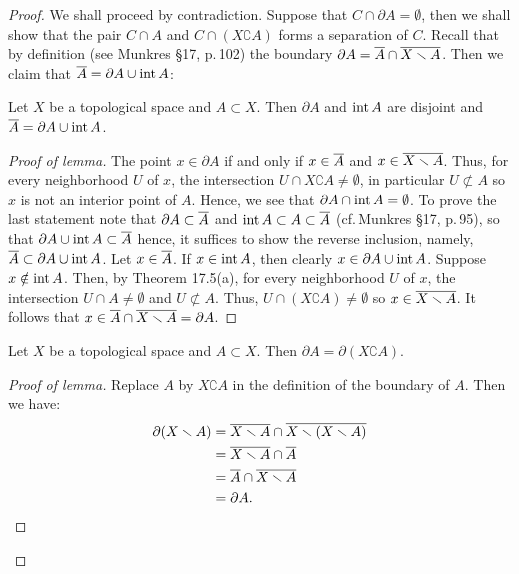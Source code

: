 \begin{proof}
We shall proceed by contradiction. Suppose that $C\cap\partial
A=\emptyset$, then we shall show that the pair $C\cap A$ and
$C\cap(X\complement A)$ forms a separation of
$C$. Recall that by definition (see Munkres \S17, p.\,102) the
boundary $\partial A=\overline{A}\cap\overline{X\smallsetminus A}$. Then we
claim that $\overline{A}=\partial A\cup \operatorname{int} A$:
\begin{lemma}
Let $X$ be a topological space and $A\subset X$. Then $\partial
A$ and $\operatorname{int}{A}$ are disjoint and $\overline{A}=\partial A\cup\operatorname{int}
A$.
\end{lemma}
\begin{proof}[Proof of lemma]
\renewcommand\qedsymbol{$\clubsuit$}
The point $x\in\partial A$ if and only if $x\in\overline{A}$ and
$x\in\overline{X\smallsetminus A}$. Thus, for every neighborhood $U$ of
$x$, the intersection $U\cap X\complement A\neq\emptyset$, in
particular $U\nsubset A$ so $x$ is not an interior point of
$A$. Hence, we see that $\partial A\cap\operatorname{int} A=\emptyset$. To
prove the last statement note that $\partial A\subset\overline{A}$ and
$\operatorname{int} A\subset A\subset\overline{A}$ (cf.\,Munkres \S17, p.\,95), so
that $\partial A\cup\operatorname{int} A\subset\overline{A}$ hence, it suffices to
show the reverse inclusion, namely, $\overline{A}\subset\partial
A\cup\operatorname{int} A$. Let $x\in\overline{A}$. If $x\in\operatorname{int} A$, then clearly
$x\in\partial A\cup\operatorname{int} A$. Suppose $x\notin\operatorname{int} A$. Then, by
Theorem 17.5(a), for every neighborhood $U$ of $x$, the
intersection $U\cap A\neq\emptyset$ and $U\nsubset A$. Thus,
$U\cap (X\complement A)\neq\emptyset$ so $x\in\overline{X\smallsetminus
  A}$. It follows that $x\in\overline{A}\cap\overline{X\smallsetminus
  A}=\partial A$.
\end{proof}
\begin{lemma}
Let $X$ be a topological space and $A\subset X$. Then $\partial
A=\partial(X\complement A)$.
\end{lemma}
\begin{proof}[Proof of lemma]
\renewcommand\qedsymbol{$\clubsuit$}
Replace $A$ by $X\complement A$ in the definition of the boundary
of $A$. Then we have:
\begin{align*}
\partial(X\smallsetminus A)&=\overline{X\smallsetminus A}\cap
                             \overline{X\smallsetminus(X\smallsetminus A)}\\
&=\overline{X\smallsetminus A}\cap\overline{A}\\
&=\overline{A}\cap\overline{X\smallsetminus A}\\
&=\partial A.
\end{align*}
\end{proof}

\end{proof}
